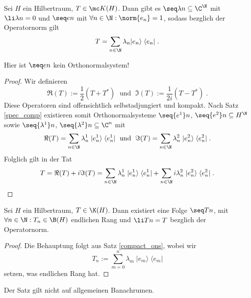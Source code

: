 \begin{theorem}
	\label{compact_ons}
	Sei $H$ ein Hilbertraum, \(T\in\mc K(H)\). Dann gibt es \(\seq \lambda n \subseteq \C^\N\) mit \(\li \lambda n = 0\) und \(\seq en\) mit \(\forall n \in\N: \norm{e_n} = 1\), sodass bez\us glich der Operatornorm gilt
	\[T = \sum_{n\in\N} \lambda_n \vert e_n\rangle \;\langle e_n\vert\;.\]
\end{theorem}
\begin{rem}
	Hier ist \(\seq en\) kein Orthonormalsystem!
\end{rem}
\begin{proof} 
	Wir definieren 
	\[\Re(T) := \frac{1}{2}(T + T^*)\;\text{ und } \; \Im(T) := \frac{1}{2i} (T-T^*)\;.\]
	Diese Operatoren sind offensichtlich selbstadjungiert und kompakt. Nach Satz \ref{spec_comp} existieren somit Orthonormalsysteme \(\seq{e^1} n\), \(\seq{e^2}n\subseteq H^\N\) sowie \(\seq{\lambda^1}n\), \(\seq{\lambda^2}n \subseteq \C^n\) mit 
	\[\Re(T) = \sum_{n\in\N} \lambda^1_n \;\vert e^1_n\rangle \;\langle e^1_n\vert\;\text{ und }\; \Im(T) = \sum_{n\in\N} \lambda^2_n \;\vert e^2_n\rangle \;\langle e^2_n\vert\;.\]
	Folglich gilt in der Tat
	\[T = \Re(T) + i  \Im(T) = \sum_{n\in\N} \lambda^1_n \;\vert e^1_n\rangle \;\langle e^1_n\vert + \sum_{n\in\N} i\lambda^2_n \;\vert e^2_n\rangle \;\langle e^2_n\vert\;.\]
\end{proof}

\begin{theorem}
	Sei $H$ ein Hilbertraum, \(T\in \K(H)\). Dann existiert eine Folge \(\seq Tn\), mit \(\forall n\in\N: T_n \in \B(H)\) endlichen Rang und \(\li Tn = T\) bez\us glich der Operatornorm.
\end{theorem}
\begin{proof}
	Die Behauptung folgt aus Satz \ref{compact_ons}, wobei wir
	\[T_n := \sum_{m=0}^n \lambda_m \;\vert e_m\rangle \;\langle e_m \vert\]
	setzen, was endlichen Rang hat.
	\end{proof}
	\begin{rem}
		Der Satz gilt nicht auf allgemeinen Banachr\as umen.
	\end{rem}


